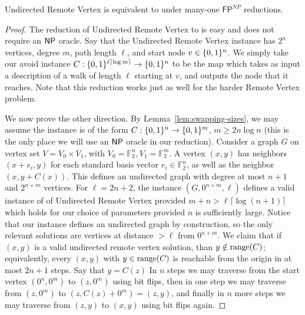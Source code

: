 \begin{theorem}\label{range:thm:undirected-remote-vertex-equivalence}
{\sc Undirected Remote Vertex} is equivalent to \avoid under many-one $\mathsf{FP}^{NP}$ reductions.
\end{theorem}
\begin{proof}
The reduction of {\sc Undirected Remote Vertex} to \avoid is easy and does not require an $\cl{NP}$ oracle. Say that the {\sc Undirected Remote Vertex} instance has $2^n$ vertices, degree $m$, path length $\ell$, and start node $v \in \{0,1\}^n$. We simply take our avoid instance $C: \{0,1\}^{\ell \lceil \log m \rceil} \to \{0,1\}^n$ to be the map which takes as input a description of a walk of length $\ell$ starting at $v$, and outputs the node that it reaches. Note that this reduction works just as well for the harder {\sc Remote Vertex} problem.

We now prove the other direction. By Lemma~\ref{lem:swapping-sizes}, we may assume the \avoid instance is of the form $C: \{0,1\}^n \to \{0,1\}^m$, $m \geq 2 n \log n$ (this is the only place we will use an $\cl{NP}$ oracle in our reduction). Consider a graph $G$ on vertex set $V = V_0 \times V_1$, with $V_0 = \mathbb{F}_2^n,  V_1 = \mathbb{F}_2^m$. A vertex $(x,y)$ has neighbors $(x + e_i, y)$ for each standard basis vector $e_i \in \mathbb{F}_2^n$, as well as the neighbor $(x, y+ C(x))$. This defines an undirected graph with degree at most $n + 1$ and $2^{n + m}$ vertices. For $\ell = 2n+2$, the instance $(G, 0^{n+m},\ell)$ defines a valid instance of of {\sc Undirected Remote Vertex} provided $m + n  > \ell \lceil \log (n+1) \rceil $ which holds for our choice of parameters provided $n$ is sufficiently large. Notice that our instance defines an undirected graph by construction, so the only relevant solutions are vertices at distance $> \ell$ from $0^{n+m}$.
We claim that if $(x,y)$ is a valid undirected remote vertex solution, than $y \notin \mathrm{range}(C)$; equivalently, every $(x,y)$ with $y \in \mathrm{range}(C)$ is reachable from the origin in at most $2n + 1$ steps. Say that $y = C(z)$ In $n$ steps we may traverse from the start vertex $(0^n, 0^m)$ to $(z, 0^m)$ using bit flips, then in one step we may traverse from $(z, 0^m)$ to $(z, C(z) + 0^m) = (z, y)$, and finally in $n$ more steps we may traverse from $(z,y)$ to $(x, y)$ using bit flips again. 
\end{proof}


